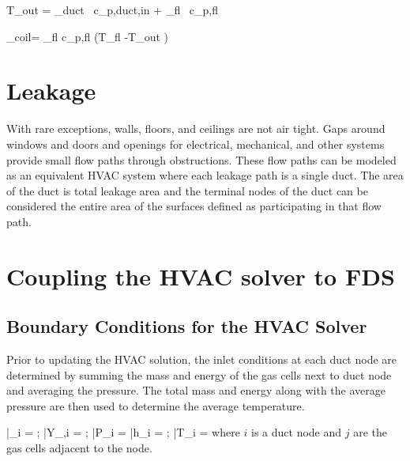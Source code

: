 \be T_{\rm out} = 
                             {_{\rm duct} \, c_{p,{\rm duct,in}} + _{\rm fl} \, c_{p,{\rm fl}} } \ee

\be {}_{\rm coil}= _{\rm fl} c_{p,{\rm fl}} \left(T_{\rm fl} -T_{\rm out} \right) \eta \ee

\section{Leakage}

With rare exceptions, walls, floors, and ceilings are not air tight.  Gaps around windows and doors and openings for electrical, mechanical, and other systems provide small flow paths through obstructions.  These flow paths can be modeled as an equivalent HVAC system where each leakage path is a single duct.  The area of the duct is total leakage area and the terminal nodes of the duct can be considered the entire area of the surfaces defined as participating in that flow path.


\newpage
\section{Coupling the HVAC solver to FDS}

\subsection{Boundary Conditions for the HVAC Solver}

Prior to updating the HVAC solution, the inlet conditions at each duct node are determined by summing the mass and energy of the gas cells next to duct node and averaging the pressure.  The total mass and energy along with the average pressure are then used to determine the average temperature.


\be \bar{\rho}_i =   \quad ; \quad
    \bar{Y}_{\alpha,i} =   \quad ; \quad
    \bar{P}_i =   \ee
\be \bar{h}_i =   \quad ; \quad
    \bar{T}_i =  \ee
where $i$ is a duct node and $j$ are the gas cells adjacent to the node.

